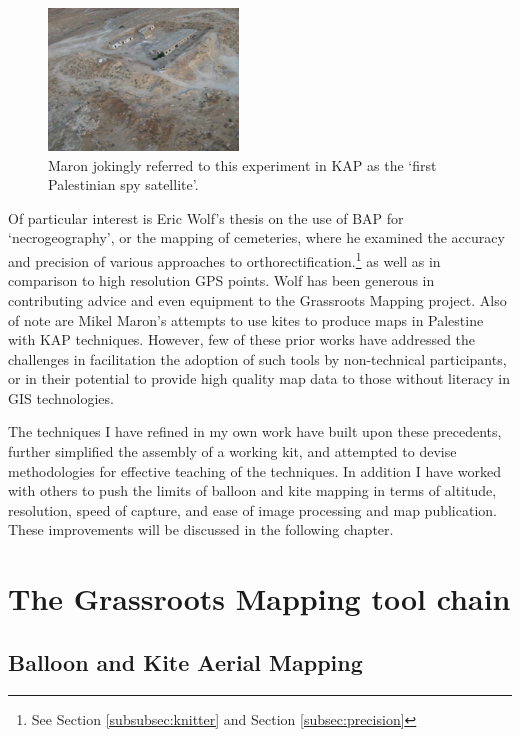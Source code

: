 \documentclass[11pt,oneside,notitlepage]{report}
\begin{document}
\begin{figure}
	\begin{flushright}
		\includegraphics[width=0.45\textwidth]{images/maron-spy-satellite.jpg}
		\caption{Maron jokingly referred to this experiment in \ac{KAP} as the `first Palestinian spy satellite'. \cite{maron2008former}}
	\end{flushright}
\end{figure}

Of particular interest is Eric Wolf's thesis on the use of \ac{BAP} for `necrogeography', or the mapping of cemeteries, where he examined the accuracy and precision of various approaches to orthorectification.\footnote{See Section \ref{subsubsec:knitter} and Section \ref{subsec:precision}} as well as in comparison to high resolution GPS points. Wolf has been generous in contributing advice and even equipment to the Grassroots Mapping project. Also of note are Mikel Maron's attempts to use kites to produce maps in Palestine \cite{maron2008former} with \ac{KAP} techniques. However, few of these prior works have addressed the challenges in facilitation the adoption of such tools by non-technical participants, or in their potential to provide high quality map data to those without literacy in GIS technologies.  

The techniques I have refined in my own work have built upon these precedents, further simplified the assembly of a working kit, and attempted to devise methodologies for effective teaching of the techniques. In addition I have worked with others to push the limits of balloon and kite mapping in terms of altitude, resolution, speed of capture, and ease of image processing and map publication. These improvements will be discussed in the following chapter.

\chapter{The Grassroots Mapping tool chain}
\label{chap:toolchain}

\section{Balloon and Kite Aerial Mapping}
\end{document}
